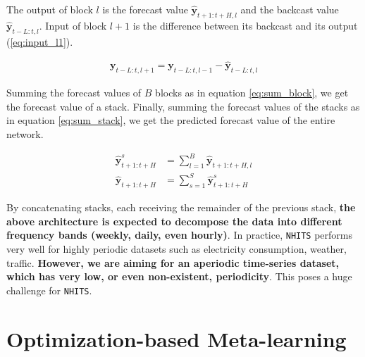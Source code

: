 The output of block $l$ is the forecast value $\mathbf{\hat{y}}_{t+1:t+H, l}$ and the backcast value $\mathbf{\hat{y}}_{ t-L:t, l}$. Input of block $l+1$ is the difference between its backcast and its output (\ref{eq:input_l1}).

\begin{align}
    \mathbf{y}_{t-L:t, l+1} = \mathbf{y}_{t-L:t, l-1} - \mathbf{\hat{y}}_{t-L:t, l}
    \label{eq:input_l1}
\end{align}


Summing the forecast values of $B$ blocks as in equation \ref{eq:sum_block}, we get the forecast value of a stack. Finally, summing the forecast values of the stacks as in equation \ref{eq:sum_stack}, we get the predicted forecast value of the entire network.

\begin{align}
    \mathbf{\hat{y}}_{t+1:t+H}^s &= \sum_{l=1}^{B}{\mathbf{\hat{y}}_{t+1:t+H, l}} \label{eq:sum_block}\\
    \mathbf{\hat{y}}_{t+1:t+H} &= \sum_{s=1}^{S}{\mathbf{\hat{y}}_{t+1:t+H}^s} \label{eq:sum_stack}
\end{align}


By concatenating stacks, each receiving the remainder of the previous stack, \textbf{the above architecture is expected to decompose the data into different frequency bands (weekly, daily, even hourly)}. In practice, \verb|NHITS| performs very well for highly periodic datasets such as electricity consumption, weather, traffic. \textbf{However, we are aiming for an aperiodic time-series dataset, which has very low, or even non-existent, periodicity}. This poses a huge challenge for \verb|NHITS|.

\section{Optimization-based Meta-learning}
\label{sec:ml}

